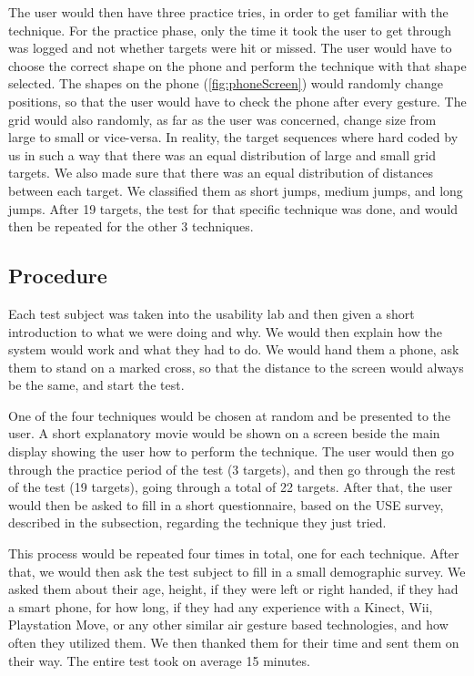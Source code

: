 The user would then have three practice tries, in order to get familiar with the technique. 
For the practice phase, only the time it took the user to get through was logged and not whether targets were hit or missed. 
The user would have to choose the correct shape on the phone and perform the technique with that shape selected. 
The shapes on the phone (\cref{fig:phoneScreen}) would randomly change positions, so that the user would have to check the phone after every gesture. 
The grid would also randomly, as far as the user was concerned, change size from large to small or vice-versa. In reality, the target sequences where hard coded by us in such a way that there was an equal distribution of large and small grid targets. We also made sure that there was an equal distribution of distances between each target. We classified them as short jumps, medium jumps, and long jumps. 
After 19 targets, the test for that specific technique was done, and would then be repeated for the other 3 techniques. 

\subsection{Procedure}

Each test subject was taken into the usability lab and then given a short introduction to what we were doing and why. 
We would then explain how the system would work and what they had to do. 
We would hand them a phone, ask them to stand on a marked cross, so that the distance to the screen would always be the same, and start the test.

One of the four techniques would be chosen at random and be presented to the user. 
A short explanatory movie would be shown on a screen beside the main display showing the user how to perform the technique. 
The user would then go through the practice period of the test (3 targets), and then go through the rest of the test (19 targets), going through a total of 22 targets. 
After that, the user would then be asked to fill in a short questionnaire, based on the USE survey, described in the  subsection, regarding the technique they just tried. 

This process would be repeated four times in total, one for each technique. 
After that, we would then ask the test subject to fill in a small demographic survey. 
We asked them about their age, height, if they were left or right handed, if they had a smart phone, for how long, if they had any experience with a Kinect, Wii, Playstation Move, or any other similar air gesture based technologies, and how often they utilized them. 
We then thanked them for their time and sent them on their way. 
The entire test took on average 15 minutes. 